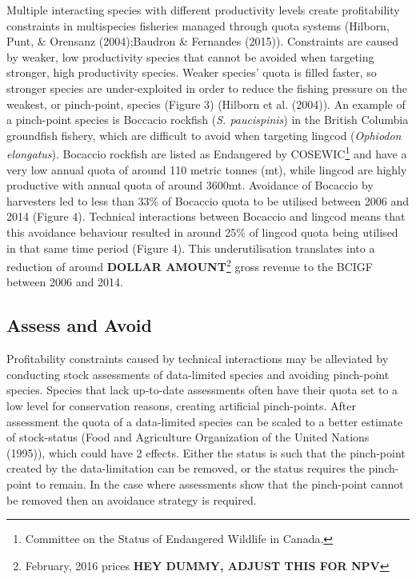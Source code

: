 \documentclass[12pt,]{scrartcl}
\begin{document}
Multiple interacting species with different productivity levels create
profitability constraints in multispecies fisheries managed through
quota systems (Hilborn, Punt, \& Orensanz (2004);Baudron \& Fernandes
(2015)). Constraints are caused by weaker, low productivity species that
cannot be avoided when targeting stronger, high productivity species.
Weaker species' quota is filled faster, so stronger species are
under-exploited in order to reduce the fishing pressure on the weakest,
or pinch-point, species (Figure 3) (Hilborn et al. (2004)). An example
of a pinch-point species is Boccacio rockfish (\emph{S. paucispinis}) in
the British Columbia groundfish fishery, which are difficult to avoid
when targeting lingcod (\emph{Ophiodon elongatus}). Bocaccio rockfish
are listed as Endangered by COSEWIC\footnote{Committee on the Status of
  Endangered Wildlife in Canada.} and have a very low annual quota of
around 110 metric tonnes (mt), while lingcod are highly productive with
annual quota of around 3600mt. Avoidance of Bocaccio by harvesters led
to less than 33\% of Bocaccio quota to be utilised between 2006 and 2014
(Figure 4). Technical interactions between Bocaccio and lingcod means
that this avoidance behaviour resulted in around 25\% of lingcod quota
being utilised in that same time period (Figure 4). This
underutilisation translates into a reduction of around \textbf{DOLLAR
AMOUNT}\footnote{February, 2016 prices \textbf{HEY DUMMY, ADJUST THIS
  FOR NPV}} gross revenue to the BCIGF between 2006 and 2014.

\subsection{Assess and Avoid}\label{assess-and-avoid}

Profitability constraints caused by technical interactions may be
alleviated by conducting stock assessments of data-limited species and
avoiding pinch-point species. Species that lack up-to-date assessments
often have their quota set to a low level for conservation reasons,
creating artificial pinch-points. After assessment the quota of a
data-limited species can be scaled to a better estimate of stock-status
(Food and Agriculture Organization of the United Nations (1995)), which
could have 2 effects. Either the status is such that the pinch-point
created by the data-limitation can be removed, or the status requires
the pinch-point to remain. In the case where assessments show that the
pinch-point cannot be removed then an avoidance strategy is required.
\end{document}
